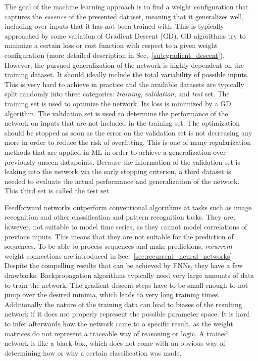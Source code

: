 The goal of the machine learning approach is to find a weight configuration
that captures the \emph{essence} of the presented dataset, meaning that it
generalizes well, including over inputs that it has not been trained with.
This is typically approached by some variation of Gradient Descent (GD). GD
algorithms try to minimize a certain loss or cost function with respect to a
given weight configuration (more detailed description in
Sec.~\ref{sub:gradient_descent}).  However, the pursued generalization of the
network is highly dependent on the training dataset. It should ideally include
the total variability of possible inputs.  This is very hard to achieve in
practice and the available datasets are typically split randomly into three
categories: \emph{training}, \emph{validation}, and \emph{test} set.  The
training set is used to optimize the network. Its loss is minimized by a GD
algorithm. The validation set is used to determine the performance of the
network on inputs that are not included in the training set.  The optimization
should be stopped as soon as the error on the validation set is not decreasing
any more in order to reduce the risk of overfitting. This is one of many
regularization methods that are applied in ML in order to achieve a
generalization over previously unseen datapoints. Because the information of
the validation set is leaking into the network via the early stopping
criterion, a third dataset is needed to evaluate the actual performance and
generalization of the network.  This third set is called the test set.

Feedforward networks outperform conventional algorithms at tasks such as image
recognition and other classification and pattern recognition tasks.  They are,
however, not suitable to model time series, as they cannot model correlations
of previous inputs. This means that they are not suitable for the prediction of
sequences.  To be able to process sequences and make predictions,
\emph{recurrent} weight connections are introduced in
Sec.~\ref{sec:recurrent_neural_networks}.  Despite the compelling results that
can be achieved by FNNs, they have a few drawbacks.  Backpropagation algorithms
typically need very large amounts of data to train the network. The gradient
descent steps have to be small enough to not jump over the desired minima,
which leads to very long training times.  Additionally the nature of the
training data can lead to biases of the resulting network if it does not
properly represent the possible parameter space.  It is hard to infer
afterwards how the network came to a specific result, as the weight matrices do
not represent a traceable way of reasoning or logic.  A trained network is like
a black box, which does not come with an obvious way of determining how or why
a certain classification was made.


